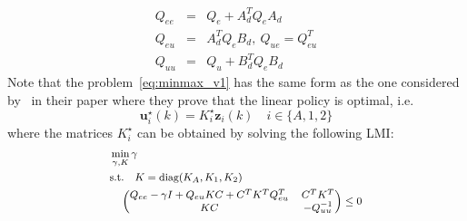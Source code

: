 \documentclass{ifacconf}
\begin{document}
\begin{eqnarray}
    Q_{ee} &=& Q_e + A_d^T Q_e A_d \\
    Q_{eu} &=& A_d^T Q_e B_d,\ Q_{ue} = Q^T_{eu} \\
    Q_{uu} &=& Q_u + B_d^T Q_e B_d
\end{eqnarray}
Note that the problem~\eqref{eq:minmax_v1} has the same form as 
the one considered by~\cite{gattami_robust_2012} in their paper
where they prove that the linear policy is optimal, i.e.
\begin{equation}
    \boldsymbol{u}^\star_{i}(k) = K^\star_i \boldsymbol{z}_{i}(k) \quad i \in \{A,1,2\} 
\end{equation}
where the matrices $K^\star_i$ can be obtained by solving 
the following LMI:
\begin{equation}
    \small
    \begin{split}
        &\min_{\gamma , K} \gamma \\
        &\text{s.t.} \quad K = \text{diag}(K_A, K_1, K_2) \\
        &\quad \left(
            \begin{matrix}
                Q_{ee} - \gamma I + Q_{eu} K C + C^T K^T Q_{eu}^T & C^T K^T \\
                KC & -Q_{uu}^{-1}
            \end{matrix}
        \right) \leq 0
    \end{split}
    \label{eq:lmi}
\end{equation}
\end{document}
